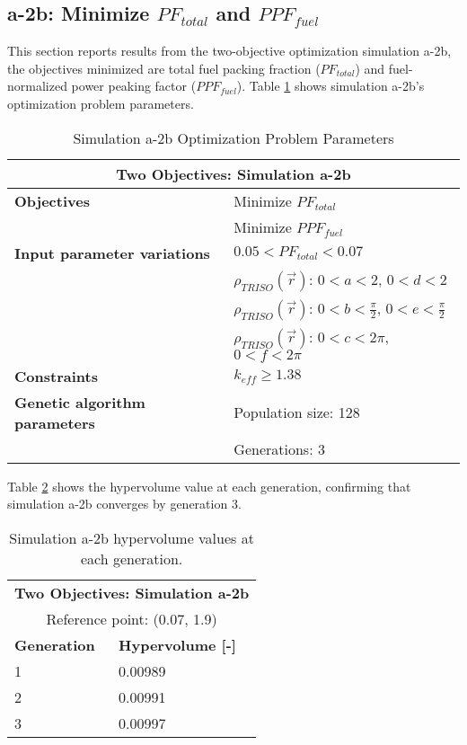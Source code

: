 \subsection{a-2b: Minimize $PF_{total}$ and $PPF_{fuel}$}
\label{sec:a-2b}
This section reports results from the two-objective optimization simulation a-2b, the 
objectives minimized are total fuel packing fraction ($PF_{total}$) and fuel-normalized 
power peaking factor ($PPF_{fuel}$).  
Table \ref{tab:simulationa2b} shows simulation a-2b's optimization problem parameters. 
\begin{table}[htbp!]
    \centering
    \onehalfspacing
    \caption{Simulation a-2b Optimization Problem Parameters}
	\label{tab:simulationa2b}
    \footnotesize
    \begin{tabular}{l|p{5.3cm}}
    \hline 
    \multicolumn{2}{c}{\textbf{Two Objectives: Simulation a-2b}} \\
    \hline 
    \textbf{Objectives} & Minimize $PF_{total}$ \\
    & Minimize $PPF_{fuel}$ \\
    \hline 
    \textbf{Input parameter variations} & $0.05<PF_{total}<0.07$ \\
    & $\rho_{TRISO}(\vec{r})$: $0<a<2$, $0<d<2$\\
    & $\rho_{TRISO}(\vec{r})$: $0<b<\frac{\pi}{2}$, $0<e<\frac{\pi}{2}$\\
    & $\rho_{TRISO}(\vec{r})$: $0<c<2\pi$, $0<f<2\pi$\\
    \hline
    \textbf{Constraints} & $k_{eff} \geq 1.38$\\ 
    \hline 
    \textbf{Genetic algorithm parameters} & Population size: 128 \\
    & Generations: 3 \\
    \hline
    \end{tabular}
\end{table}

Table \ref{tab:a2b-hypervolume} shows the hypervolume value at each generation, 
confirming that simulation a-2b converges by generation 3. 
\begin{table}[htbp!]
    \centering
    \onehalfspacing
    \caption{Simulation a-2b hypervolume values at each generation.}
	\label{tab:a2b-hypervolume}
    \footnotesize
    \begin{tabular}{ll}
    \hline 
    \multicolumn{2}{c}{\textbf{Two Objectives: Simulation a-2b}} \\
    \multicolumn{2}{c}{Reference point: (0.07, 1.9)} \\
    \hline 
    \textbf{Generation} & \textbf{Hypervolume [-]} \\
    \hline
    1 & 0.00989 \\
    2 & 0.00991 \\
    3 & 0.00997 \\
    \hline
    \end{tabular}
\end{table}

